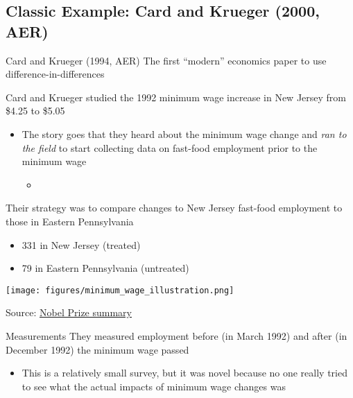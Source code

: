 \documentclass[aspectratio=169,t,11pt,table]{beamer}
\begin{document}

%   

\subsection{Classic Example: Card and Krueger (2000, AER)}

\begin{frame}{Card and Krueger (1994, AER)}
  The first ``modern'' economics paper to use difference-in-differences

  \bigskip
  Card and Krueger studied the 1992 minimum wage increase in New Jersey from \$4.25 to \$5.05
  \begin{itemize}
    \item The story goes that they heard about the minimum wage change and \emph{ran to the field} to start collecting data on fast-food employment prior to the minimum wage
    \begin{itemize}
      \item 
    \end{itemize}
  \end{itemize}

  \pause
  \bigskip
  Their strategy was to compare changes to New Jersey fast-food employment to those in Eastern Pennsylvania
  \begin{itemize}
    \item 331 in New Jersey (treated)
    \item 79 in Eastern Pennsylvania (untreated)
  \end{itemize}
\end{frame}

\begin{frame}{}
  \begin{center}
    \texttt{[image: figures/minimum\_wage\_illustration.png]}
    
    Source: \href{https://www.nobelprize.org/uploads/2021/10/fig3_ek_en_21_effectIncreasingMinimunWage.pdf}{Nobel Prize summary} 
  \end{center}
\end{frame}

\begin{frame}{Measurements}
  They measured employment before (in March 1992) and after (in December 1992) the minimum wage passed
  \begin{itemize}
    \item This is a relatively small survey, but it was novel because no one really tried to see what the actual impacts of minimum wage changes was
  \end{itemize}
\end{frame}
\end{document}
